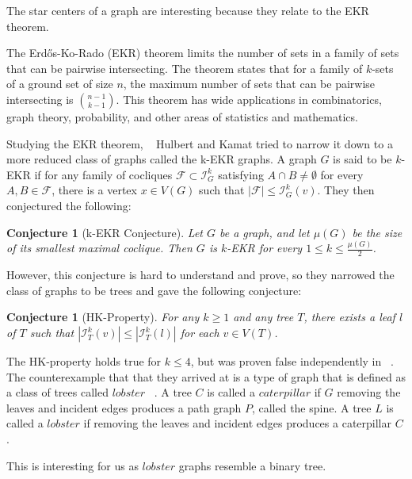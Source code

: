 \documentclass{amsart}
\newtheorem{conjecture}[theorem]{Conjecture}
\theoremstyle{definition}
\begin{document}
The star centers of a graph are interesting because they relate to the EKR theorem.

The Erd\H{o}s-Ko-Rado (EKR) theorem limits the number of sets in a family of sets that can be pairwise intersecting. The theorem states that for a family of $k$-sets of a ground set of size $n$, the maximum number of sets that can be pairwise intersecting is $\binom{n-1}{k-1}$. This theorem has wide applications in combinatorics, graph theory, probability, and other areas of statistics and mathematics.

Studying the EKR theorem, ~\cite{MR2763040} Hulbert and Kamat tried to narrow it down to a more reduced class of graphs called the k-EKR graphs. A graph $G$ is said to be $k$-EKR if for any family of cocliques $\mathcal{F} \subset \mathcal{I}^k_G$ satisfying $A \cap B \neq \emptyset$ for every $A, B \in \mathcal{F}$, there is a vertex $x \in V(G)$ such that $|\mathcal{F}| \leq \mathcal{I}^k_G(v)$. They then conjectured the following:

\begin{conjecture}[k-EKR Conjecture]
	Let $G$ be a graph, and let $\mu(G)$ be the size of its smallest maximal coclique. Then $G$ is $k$-EKR for every $1 \leq k \leq \frac{\mu(G)}{2}$.
\end{conjecture}

\newpage

However, this conjecture is hard to understand and prove, so they narrowed the class of graphs to be trees and gave the following conjecture:

\begin{conjecture}[HK-Property]
	For any $k \geq 1$ and any tree $T$, there exists a leaf $l$ of $T$ such that $|\mathcal{I}^k_T(v)| \leq |\mathcal{I}^k_T(l)|$ for each $v \in V(T)$.
\end{conjecture}

The HK-property holds true for $k \leq 4$, but was proven false independently in ~\cite{MR3271819, MR3612439, MR2523796}. The counterexample that that they arrived at is a type of graph that is defined as a class of trees called $lobster$ ~\cite{MR4245360}.
A tree $C$ is called a $caterpillar$ if $G$ removing the leaves and incident edges produces a path graph $P$, called the spine. A tree $L$ is called a $lobster$ if removing the leaves and incident edges produces a caterpillar $C$.

This is interesting for us as $lobster$ graphs resemble a binary tree.
\end{document}
